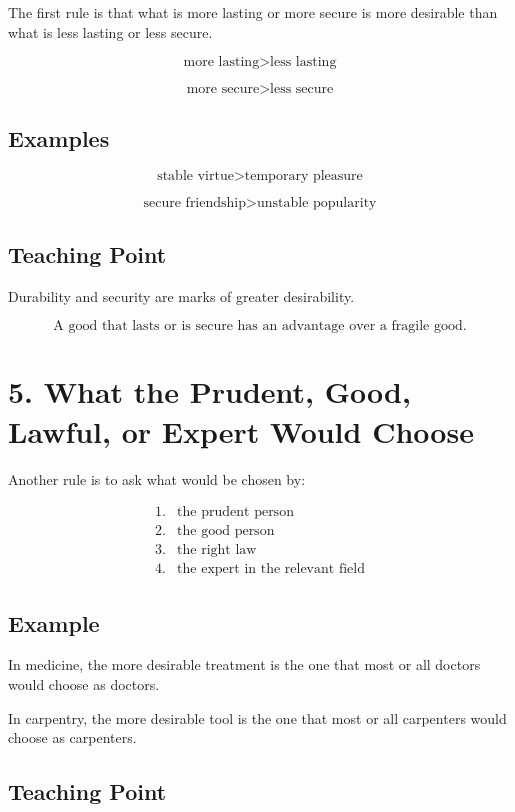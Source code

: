 \documentclass[12pt]{article}
\begin{document}
The first rule is that what is more lasting or more secure is more desirable
than what is less lasting or less secure.

\[
\text{more lasting} > \text{less lasting}
\]

\[
\text{more secure} > \text{less secure}
\]

\subsection*{Examples}

\[
\text{stable virtue} > \text{temporary pleasure}
\]

\[
\text{secure friendship} > \text{unstable popularity}
\]

\subsection*{Teaching Point}

Durability and security are marks of greater desirability.

\[
\boxed{
\text{A good that lasts or is secure has an advantage over a fragile good.}
}
\]

\section*{5. What the Prudent, Good, Lawful, or Expert Would Choose}

Another rule is to ask what would be chosen by:

\[
\begin{array}{ll}
1. & \text{the prudent person} \\
2. & \text{the good person} \\
3. & \text{the right law} \\
4. & \text{the expert in the relevant field}
\end{array}
\]

\subsection*{Example}

In medicine, the more desirable treatment is the one that most or all doctors
would choose as doctors.

In carpentry, the more desirable tool is the one that most or all carpenters
would choose as carpenters.

\subsection*{Teaching Point}
\end{document}

